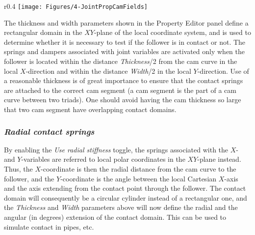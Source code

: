 \begin{wrapfigure}[3]{r}{0.4\textwidth}
  \vspace{-4.5mm}
  \texttt{[image: Figures/4-JointPropCamFields]}
\end{wrapfigure}

The thickness and width parameters shown in the Property Editor panel
define a rectangular domain in the $XY$-plane of the local coordinate system,
and is used to determine whether it is necessary to test if the follower
is in contact or not.
The springs and dampers associated with joint variables are activated only when
the follower is located within the distance {\sl Thickness}/2 from the cam curve
in the local $X$-direction and within the distance {\sl Width}/2 in the local
$Y$-direction. Use of a reasonable thickness is of great importance
to ensure that the contact springs are attached to the correct cam segment
(a cam segment is the part of a cam curve between two triads).
One should avoid having the cam thickness so large that two cam segment have
overlapping contact domains.


\subsubsection{\sl\textbf{Radial contact springs}}

By enabling the {\sl Use radial stiffness} toggle, the springs
associated with the $X$- and $Y$-variables are referred to local polar
coordinates in the $XY$-plane instead. Thus, the $X$-coordinate is then the
radial distance from the cam curve to the follower, and the $Y$-coordinate
is the angle between the local Cartesian $X$-axis and the axis extending
from the contact point through the follower. The contact domain will
consequently be a circular cylinder instead of a rectangular one, and
the {\sl Thickness} and {\sl Width} parameters above will now define
the radial and the angular (in degrees) extension of the contact domain.
This can be used to simulate contact in pipes, etc.

